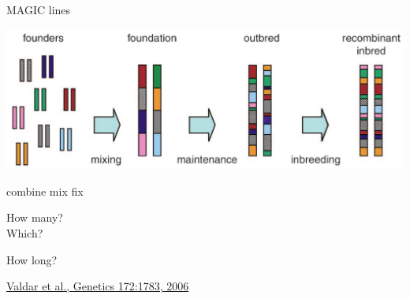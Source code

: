 \documentclass[12pt]{article}
\newcommand{\headsize}{\fontsize{35}{35} \selectfont}
\newcommand{\smallsize}{\fontsize{25}{30} \selectfont}
\newcommand{\smallersize}{\fontsize{20}{25} \selectfont}
\newcommand{\smallestsize}{\fontsize{18}{22} \selectfont}
\begin{document}
\newpage

\addtocounter{page}{-1}

\headsize \color{myyellow}
\hfill \begin{minipage}{5.75in}
\centering
MAGIC lines
\end{minipage}

\vspace{20mm}

\centerline{\includegraphics[width=10in]{Figs/valdar_genet2006.png}}

\smallsize \color{myyellow}
\hspace*{52mm} combine \hspace*{35mm} mix \hspace*{52mm} fix

\smallersize
\color{mywhite}
\vspace{20pt}

\hspace*{6mm}
\begin{minipage}[t]{45mm}
\vspace*{0mm}
\centering

How many? \\[20pt]
Which?
\end{minipage}
\hspace{57mm}
\begin{minipage}[t]{45mm}
\vspace*{0mm}
\centering

How long?
\end{minipage}
\hspace{18mm}
\begin{minipage}[t]{45mm}
\vspace*{0mm}
\centering


\end{minipage}


\vfill

\hfill {\smallestsize \color{myblue} \href{http://www.genetics.org/content/172/3/1783.full}{Valdar et al., Genetics 172:1783, 2006}}

\vspace*{5mm}
\end{document}
